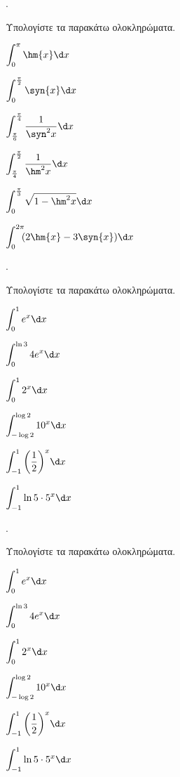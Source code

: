 \documentclass[11pt,a4paper,twocolumn]{article}
\newcounter{askhsh}
\newcommand{\askhsh}{\large\theaskhsh.\ \addtocounter{askhsh}{1}}
\begin{document}
\askhsh Υπολογίστε τα παρακάτω ολοκληρώματα.
\begin{multicols}{2}
\begin{alist}
\item $\displaystyle\int_{0}^{\pi}{\hm{x}}\d x$
\item $\displaystyle\int_{0}^{\frac{\pi}{2}}{\syn{x}}\d x$
\item $\displaystyle\int_{\frac{\pi}{6}}^{\frac{\pi}{4}}{\dfrac{1}{\syn^2{x}}}\d x$
\item $\displaystyle\int_{\frac{\pi}{4}}^{\frac{\pi}{2}}{\dfrac{1}{\hm^2{x}}}\d x$
\item $\displaystyle\int_{0}^{\frac{\pi}{3}}{\sqrt{1-\hm^2{x}}}\d x$
\item $\displaystyle\int_{0}^{2\pi}{\!\!\!(2\hm{x}-3\syn{x})}\d x$
\end{alist}
\end{multicols}
\askhsh Υπολογίστε τα παρακάτω ολοκληρώματα.
\begin{multicols}{2}
\begin{alist}
\item $\displaystyle\int_{0}^{1}{e^x}\d x$
\item $\displaystyle\int_{0}^{\ln{3}}{4e^x}\d x$
\item $\displaystyle\int_{0}^{1}{2^x}\d x$
\item $\displaystyle\int_{-\log{2}}^{\log{2}}{10^x}\d x$
\item $\displaystyle\int_{-1}^{1}{\left(\frac{1}{2}\right)^x}\d x$
\item $\displaystyle\int_{-1}^{1}{\ln{5}\cdot5^x}\d x$
\end{alist}
\end{multicols}

\askhsh Υπολογίστε τα παρακάτω ολοκληρώματα.
\begin{multicols}{2}
\begin{alist}
\item $\displaystyle\int_{0}^{1}{e^x}\d x$
\item $\displaystyle\int_{0}^{\ln{3}}{4e^x}\d x$
\item $\displaystyle\int_{0}^{1}{2^x}\d x$
\item $\displaystyle\int_{-\log{2}}^{\log{2}}{10^x}\d x$
\item $\displaystyle\int_{-1}^{1}{\left(\frac{1}{2}\right)^x}\d x$
\item $\displaystyle\int_{-1}^{1}{\ln{5}\cdot5^x}\d x$
\end{alist}
\end{multicols}
\end{document}
